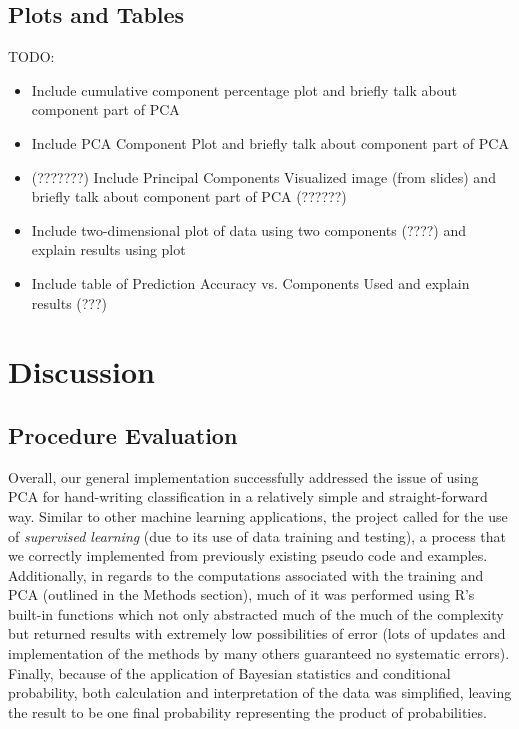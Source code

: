 \documentclass[twocolumn]{article}
\begin{document}
\subsection{Plots and Tables}
\label{subsec:plots}

TODO:
\begin{itemize}
    \item Include cumulative component percentage plot and briefly talk about component part of PCA
    \item Include PCA Component Plot and briefly talk about component part of PCA
    \item (???????) Include Principal Components Visualized image (from slides) and briefly talk about component part of PCA (??????)
    \item Include two-dimensional plot of data using two components (????) and explain results using plot
    \item Include table of Prediction Accuracy vs. Components Used and explain results (???)
\end{itemize}



\section{Discussion} %
\label{sec:discussion}
\cite{bayes}

\subsection{Procedure Evaluation}
\label{subsec:eval}

Overall, our general implementation successfully addressed the issue of using PCA for hand-writing classification in a relatively simple and straight-forward way. Similar to other machine learning applications, the project called for the use of  \emph{supervised learning} (due to its use of data training and testing), a process that we correctly implemented from previously existing pseudo code and examples. Additionally, in regards to the computations associated with the training and PCA (outlined in the Methods section), much of it was performed using R's built-in functions which not only abstracted much of the much of the complexity but returned results with extremely low possibilities of error (lots of updates and implementation of the methods by many others guaranteed no systematic errors). Finally, because of the application of Bayesian statistics and conditional probability, both calculation and interpretation of the data was simplified, leaving the result to be one final probability representing the product of probabilities. 
\end{document}
